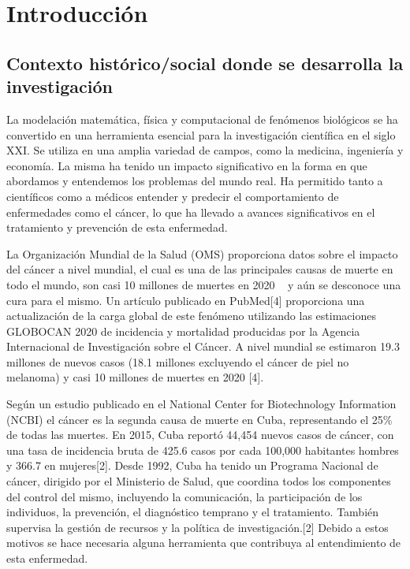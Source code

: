 \chapter*{Introducción}\label{chapter:introduction}

\section{Contexto hist\'orico/social donde se desarrolla la investigaci\'on}
\hspace{.1cm}La modelación matemática, física y computacional de fenómenos biológicos se ha convertido en una herramienta esencial para la investigación científica en el siglo XXI. Se utiliza en una amplia variedad de campos, como la medicina, ingeniería y economía. La misma ha tenido un impacto significativo en la forma en que abordamos y entendemos los problemas del mundo real. Ha permitido tanto a científicos como a médicos entender y predecir el comportamiento de enfermedades como el cáncer, lo que ha llevado a avances significativos en el tratamiento y prevención de esta enfermedad. \cite{oportunism}

\hspace{.1cm}La Organización Mundial de la Salud (OMS) proporciona datos sobre el impacto del cáncer a nivel mundial, el cual es una de las principales causas de muerte en todo el mundo, son casi 10 millones de muertes en 2020 ~\cite{3} y aún se desconoce una cura para el mismo. Un artículo publicado en PubMed[4] proporciona una actualización de la carga global de este fen\'omeno utilizando las estimaciones GLOBOCAN 2020 de incidencia y mortalidad producidas por la Agencia Internacional de Investigación sobre el Cáncer. A nivel mundial se estimaron 19.3 millones de nuevos casos (18.1 millones excluyendo el cáncer de piel no melanoma) y casi 10 millones de muertes en 2020 [4].

\hspace{.1cm}Según un estudio publicado en el National Center for Biotechnology Information (NCBI) el cáncer es la segunda causa de muerte en Cuba, representando el 25\% de todas las muertes. En 2015, Cuba reportó 44,454 nuevos casos de cáncer, con una tasa de incidencia bruta de 425.6 casos por cada 100,000 habitantes hombres y 366.7 en mujeres[2]. Desde 1992, Cuba ha tenido un Programa Nacional de cáncer, dirigido por el Ministerio de Salud, que coordina todos los componentes del control del mismo, incluyendo la comunicación, la participación de los individuos, la prevención, el diagnóstico temprano y el tratamiento. También supervisa la gestión de recursos y la política de investigación.[2] Debido a estos motivos se hace necesaria alguna herramienta que contribuya al entendimiento de esta enfermedad.

